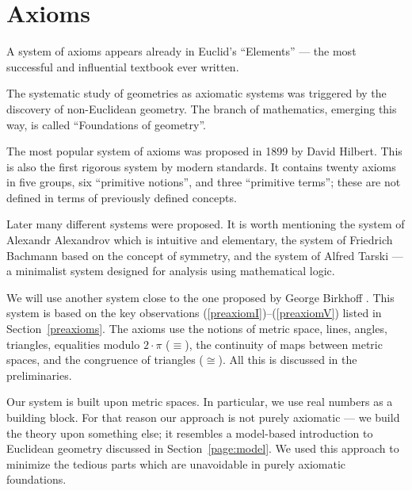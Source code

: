   
\chapter{Axioms}
\label{chap:axioms}

\vfill

A system of axioms appears already in Euclid's ``Elements'' --- the most successful and influential textbook ever written.

The systematic study of geometries as axiomatic systems
 was
triggered by the discovery of non-Euclidean geometry.
The branch of mathematics, emerging this way, is called ``Foundations of geometry''.

The most popular system of axioms
was proposed in 1899 by David Hilbert.
This is also the first rigorous system by modern standards.
It contains twenty axioms in five groups, six ``primitive notions'', and three ``primitive terms'';
these are not defined in terms of previously defined concepts.

Later many different systems were proposed.
It is worth mentioning
the system of Alexandr Alexandrov \cite{alexandrov} which is intuitive and elementary, 
the system of Friedrich Bachmann \cite{bachmann} based on the concept of symmetry,
and the system of Alfred Tarski \cite{tarski} --- a minimalist system designed for analysis using mathematical logic.

We will use another system close to the one proposed by George Birkhoff \cite{birkhoff}.
This system is based on the key observations (\ref{preaxiomI})--(\ref{preaxiomV}) listed in Section~\ref{preaxioms}.
The axioms use the notions of 
metric space, 
lines, 
angles,
triangles,
equalities modulo $2\cdot\pi$ ($\equiv$), 
the continuity of maps between metric spaces,
and the congruence of triangles ($\cong$).
All this is discussed in the preliminaries.

Our system is built upon metric spaces.
In particular, we use real numbers as a building block. 
For that reason our approach is not purely axiomatic --- we build the theory upon something else;
it resembles a model-based introduction to Euclidean geometry discussed in Section~\ref{page:model}.
We used this approach to minimize the tedious parts which are unavoidable in purely axiomatic foundations.

